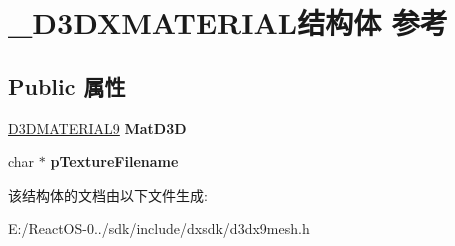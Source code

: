 \hypertarget{struct___d3_d_x_m_a_t_e_r_i_a_l}{}\section{\+\_\+\+D3\+D\+X\+M\+A\+T\+E\+R\+I\+A\+L结构体 参考}
\label{struct___d3_d_x_m_a_t_e_r_i_a_l}
\subsection*{Public 属性}
\begin{DoxyCompactItemize}
\item 
\mbox{\label{struct___d3_d_x_m_a_t_e_r_i_a_l_a48e0f78dcae0de2f9e65cd626de4e7b2}} 
\hyperlink{struct___d3_d_m_a_t_e_r_i_a_l9}{D3\+D\+M\+A\+T\+E\+R\+I\+A\+L9} {\bfseries Mat\+D3D}
\item 
\mbox{\label{struct___d3_d_x_m_a_t_e_r_i_a_l_a60c6167b912bf287bfac700ab6ef87ea}} 
char $\ast$ {\bfseries p\+Texture\+Filename}
\end{DoxyCompactItemize}


该结构体的文档由以下文件生成\+:\begin{DoxyCompactItemize}
\item 
E\+:/\+React\+O\+S-\/0../sdk/include/dxsdk/d3dx9mesh.\+h\end{DoxyCompactItemize}
